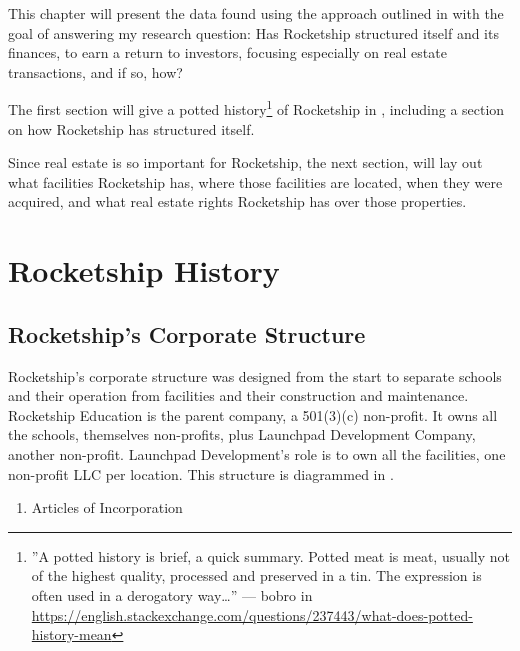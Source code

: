 This chapter will present the data found using the approach outlined in  with the goal of answering my research question: Has Rocketship structured itself and its finances, to earn a return to investors, focusing especially on real estate transactions, and if so, how?

The first section will give a potted history\footnote{''A potted history is brief, a quick summary. Potted meat is meat, usually not of the highest quality, processed and preserved in a tin. The expression is often used in a derogatory way\ldots'' — bobro in \url{https://english.stackexchange.com/questions/237443/what-does-potted-history-mean}} of Rocketship in , including a section on how Rocketship has structured itself. 

Since real estate is so important for Rocketship, the next section,  will lay out what facilities Rocketship has, where those facilities are located, when they were acquired, and what real estate rights Rocketship has over those properties.

\section{Rocketship History}\label{sec:history}\indent

\subsection{Rocketship's Corporate Structure}\label{sec:rocketship-corp-struct}\indent

Rocketship's corporate structure was designed from the start to separate schools and their operation from facilities and their construction and maintenance. Rocketship Education is the parent company, a 501(3)(c) non-profit. It owns all the schools, themselves non-profits, plus Launchpad Development Company, another non-profit. Launchpad Development's role is to own all the facilities, one non-profit LLC per location. This structure is diagrammed in .

\begin{enumerate}
  \item Articles of Incorporation
\end{enumerate}

